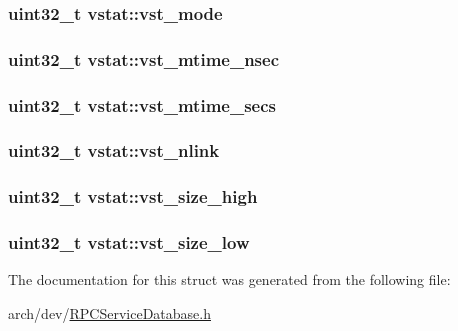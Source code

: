 \hypertarget{structvstat_a78eea0375dc317473064e4dc1acc7f2b}{
\subsubsection[{vst\+\_\+mode}]{\setlength{\rightskip}{0pt plus 5cm}uint32\+\_\+t vstat\+::vst\+\_\+mode}}\label{structvstat_a78eea0375dc317473064e4dc1acc7f2b}
\hypertarget{structvstat_a6e27926dc04ae8d48041115255d6b916}{
\subsubsection[{vst\+\_\+mtime\+\_\+nsec}]{\setlength{\rightskip}{0pt plus 5cm}uint32\+\_\+t vstat\+::vst\+\_\+mtime\+\_\+nsec}}\label{structvstat_a6e27926dc04ae8d48041115255d6b916}
\hypertarget{structvstat_a7e20cca05929c6d5d14d225b7314045a}{
\subsubsection[{vst\+\_\+mtime\+\_\+secs}]{\setlength{\rightskip}{0pt plus 5cm}uint32\+\_\+t vstat\+::vst\+\_\+mtime\+\_\+secs}}\label{structvstat_a7e20cca05929c6d5d14d225b7314045a}
\hypertarget{structvstat_af222b7b822a59063156c71ae2abef50a}{
\subsubsection[{vst\+\_\+nlink}]{\setlength{\rightskip}{0pt plus 5cm}uint32\+\_\+t vstat\+::vst\+\_\+nlink}}\label{structvstat_af222b7b822a59063156c71ae2abef50a}
\hypertarget{structvstat_a78ee9821e278bb2d8c1a71fe187e5e00}{
\subsubsection[{vst\+\_\+size\+\_\+high}]{\setlength{\rightskip}{0pt plus 5cm}uint32\+\_\+t vstat\+::vst\+\_\+size\+\_\+high}}\label{structvstat_a78ee9821e278bb2d8c1a71fe187e5e00}
\hypertarget{structvstat_ae4ae30291cc797b7bd15e444f8daa59b}{
\subsubsection[{vst\+\_\+size\+\_\+low}]{\setlength{\rightskip}{0pt plus 5cm}uint32\+\_\+t vstat\+::vst\+\_\+size\+\_\+low}}\label{structvstat_ae4ae30291cc797b7bd15e444f8daa59b}


The documentation for this struct was generated from the following file\+:\begin{DoxyCompactItemize}
\item 
arch/dev/\hyperlink{_r_p_c_service_database_8h}{R\+P\+C\+Service\+Database.\+h}\end{DoxyCompactItemize}
